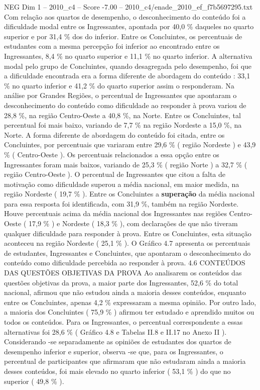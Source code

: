 \begin{textsample}{NEG Dim 1 – 2010\_c4 – Score -7.00 – 2010\_c4/enade\_2010\_ef\_f7b5697295.txt}
Com relação aos quartos de desempenho, o desconhecimento do conteúdo foi a dificuldade modal entre os Ingressantes, apontada por 40,0 \% daqueles no quarto superior e por 31,4 \% dos do inferior.
Entre os Concluintes, os percentuais de estudantes com a mesma percepção foi inferior ao encontrado entre os Ingressantes, 8,4 \% no quarto superior e 11,1 \% no quarto inferior.
A alternativa modal pelo grupo de Concluintes, quando desagregada pelo desempenho, foi que a dificuldade encontrada era a forma diferente de abordagem do conteúdo : 33,1 \% no quarto inferior e 41,2 \% do quarto superior assim o responderam.
Na análise por Grandes Regiões, o percentual de Ingressantes que apontaram o desconhecimento do conteúdo como dificuldade ao responder à prova variou de 28,8 \%, na região Centro-Oeste a 40,8 \%, na Norte.
Entre os Concluintes, tal percentual foi mais baixo, variando de 7,7 \% na região Nordeste a 15,0 \%, na Norte.
A forma diferente de abordagem do conteúdo foi citada, entre os Concluintes, por percentuais que variaram entre 29,6 \% ( região Nordeste ) e 43,9 \% ( Centro-Oeste ).
Os percentuais relacionados a essa opção entre os Ingressantes foram mais baixos, variando de 25,3 \% ( região Norte ) a 32,7 \% ( região Centro-Oeste ).
O percentual de Ingressantes que citou a falta de motivação como dificuldade superou a média nacional, em maior medida, na região Nordeste ( 19,7 \% ).
Entre os Concluintes a \textbf{superação} da média nacional para essa resposta foi identificada, com 31,9 \%, também na região Nordeste.
Houve percentuais acima da média nacional dos Ingressantes nas regiões Centro-Oeste ( 17,9 \% ) e Nordeste ( 18,3 \% ), com declarações de que não tiveram qualquer dificuldade para responder à prova.
Entre os Concluintes, esta situação aconteceu na região Nordeste ( 25,1 \% ).
O Gráfico 4.7 apresenta os percentuais de estudantes, Ingressantes e Concluintes, que apontaram o desconhecimento do conteúdo como dificuldade percebida ao responder à prova. 4.6 CONTEÚDOS DAS QUESTÕES OBJETIVAS DA PROVA Ao analisarem os conteúdos das questões objetivas da prova, a maior parte dos Ingressantes, 52,6 \% do total nacional, afirmou que não estudou ainda a maioria desses conteúdos, enquanto entre os Concluintes, apenas 4,2 \% expressaram a mesma opinião.
Por outro lado, a maioria dos Concluintes ( 75,9 \% ) afirmou ter estudado e aprendido muitos ou todos os conteúdos.
Para os Ingressantes, o percentual correspondente a essas alternativas foi 28,6 \% ( Gráfico 4.8 e Tabelas II.8 e II.17 no Anexo II ).
Considerando -se separadamente as opiniões de estudantes dos quartos de desempenho inferior e superior, observa -se que, para os Ingressantes, o percentual de participantes que afirmaram que não estudaram ainda a maioria desses conteúdos, foi mais elevado no quarto inferior ( 53,1 \% ) do que no superior ( 49,8 \% ).

\end{textsample}
